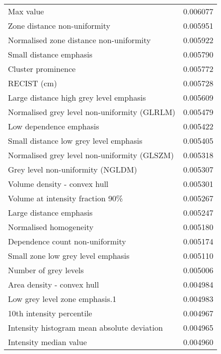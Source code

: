 \begin{longtable}{|lr|}
Max value                                          &        0.006077 \\
Zone distance non-uniformity                       &        0.005951 \\
Normalised zone distance non-uniformity            &        0.005922 \\
Small distance emphasis                            &        0.005790 \\
Cluster prominence                                 &        0.005772 \\
RECIST (cm)                                        &        0.005728 \\
Large distance high grey level emphasis            &        0.005609 \\
Normalised grey level non-uniformity (GLRLM)       &        0.005479 \\
Low dependence emphasis                            &        0.005422 \\
Small distance low grey level emphasis             &        0.005405 \\
Normalised grey level non-uniformity (GLSZM)       &        0.005318 \\
Grey level non-uniformity (NGLDM)                  &        0.005307 \\
Volume density - convex hull                       &        0.005301 \\
Volume at intensity fraction 90\%                   &        0.005267 \\
Large distance emphasis                            &        0.005247 \\
Normalised homogeneity                             &        0.005180 \\
Dependence count non-uniformity                    &        0.005174 \\
Small zone low grey level emphasis                 &        0.005110 \\
Number of grey levels                              &        0.005006 \\
Area density - convex hull                         &        0.004984 \\
Low grey level zone emphasis.1                     &        0.004983 \\
10th intensity percentile                          &        0.004967 \\
Intensity histogram mean absolute deviation        &        0.004965 \\
Intensity median value                             &        0.004960 \\

\end{longtable}
